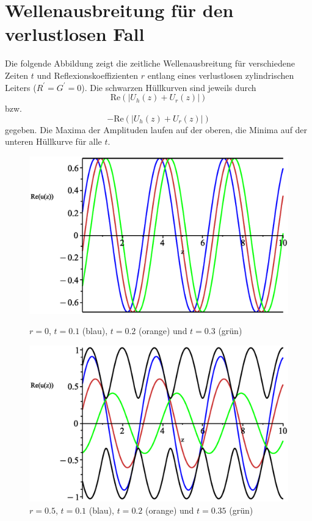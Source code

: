 \documentclass[paper=a4, parskip=half-, ngerman, fontsize=11pt]{scrreprt}
\begin{document}
\chapter{Wellenausbreitung für den verlustlosen Fall}
Die folgende Abbildung zeigt die zeitliche Wellenausbreitung für verschiedene Zeiten $t$ und Reflexionskoeffizienten
$r$ entlang eines verlustlosen zylindrischen Leiters ($R^{\prime} = G^{\prime} = 0$). Die schwarzen Hüllkurven sind
jeweils durch \[
\mathrm{Re} ( \left| U_{h}(z) + U_{r}(z) \right| )
\] bzw. \[
- \mathrm{Re} ( \left| U_{h}(z) + U_{r}(z) \right| )
\] gegeben. Die Maxima der Amplituden laufen auf der oberen, die Minima auf der unteren Hüllkurve für alle $t$.
\begin{figure}[!htpb]
    \begin{minipage}{0.45\textwidth}
        \centering
        \includegraphics[width=\linewidth]{../graphics/Enveloppe/verlustlos/R0}
        \caption*{$r=0$, $t=0.1$ (blau), $t=0.2$ (orange) und $t=0.3$ (grün)}
    \end{minipage}\hfill
    \begin{minipage}{0.45\textwidth}
        \centering
        \includegraphics[width=\linewidth]{../graphics/Enveloppe/verlustlos/R0.5}
        \caption*{$r=0.5$, $t=0.1$ (blau), $t=0.2$ (orange) und $t=0.35$ (grün)}
    \end{minipage}


\end{figure}
\end{document}
